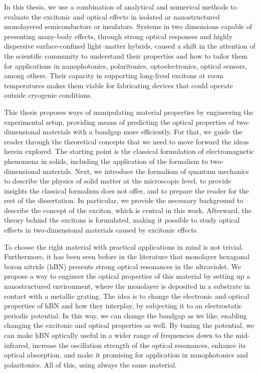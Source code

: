 


%

In this thesis, we use a combination of analytical and numerical methods to evaluate the excitonic and optical effects in isolated or nanostructured monolayered semiconductors or insulators.
Systems in two dimensions capable of presenting many-body effects, through strong optical responses and highly dispersive surface-confined light--matter hybrids, caused a shift in the attention of the scientific community to
understand their properties and how to tailor them for applications in nanophotonics, polaritonics, optoelectronics, optical sensors, among others.
Their capacity in supporting long-lived excitons at room temperatures makes them viable for fabricating devices that could operate outside cryogenic conditions.

This thesis proposes ways of manipulating material properties by engineering the experimental setup, providing means of predicting the optical properties of two-dimensional materials with a bandgap more efficiently.
For that, we guide the reader through the theoretical concepts that we need to move forward the ideas herein explored.
The starting point is the classical formulation of electromagnetic phenomena in solids, including the application of the formalism to two-dimensional materials.
Next, we introduce the formalism of quantum mechanics to describe the physics of solid matter at the microscopic level, to provide insights the classical formalism does not offer, and to prepare the reader for the rest of the dissertation.
In particular, we provide the necessary background to describe the concept of the exciton, which is central in this work.
Afterward, the theory behind the excitons is formulated, making it possible to study optical effects in two-dimensional materials caused by excitonic effects.

To choose the right material with practical applications in mind is not trivial.
Furthermore, it has been seen before in the literature that monolayer hexagonal boron nitride (hBN) presents strong optical resonances in the ultraviolet.
We propose a way to engineer the optical properties of this material by setting up a nanostructured environment, where the monolayer is deposited in a substrate in contact with a metallic grating.
The idea is to change the electronic and optical properties of hBN and how they interplay, by subjecting it to an electrostatic periodic potential.
In this way, we can change the bandgap as we like, enabling changing the excitonic and optical properties as well.
By tuning the potential, we can make hBN optically useful in a wider range of frequencies down to the mid-infrared, increase the oscillation strength of the optical resonances, enhance its optical absorption,
and make it promising for application in nanophotonics and polaritonics.
All of this, using always the same material.

